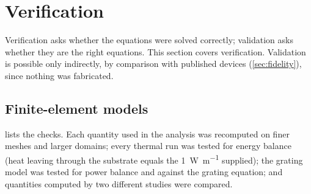 \section{Verification}
\label{sec:verification}

Verification asks whether the equations were solved correctly; validation asks whether they are the right
equations. This section covers verification. Validation is possible only indirectly, by
comparison with published devices (\cref{sec:fidelity}), since nothing was fabricated.

\subsection{Finite-element models}
\label{sec:comsolchecks}

 lists the checks. Each quantity used in the analysis was recomputed on finer meshes and larger
domains; every thermal run was tested for energy balance (heat leaving through the substrate equals the
\qty{1}{\watt\per\metre} supplied); the grating model was tested for power balance and against the grating
equation; and quantities computed by two different studies were compared.

